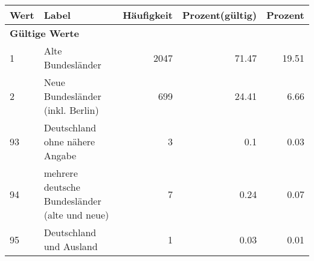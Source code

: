      \begin{longtable}{lXrrr}
     \toprule
     \textbf{Wert} & \textbf{Label} & \textbf{Häufigkeit} & \textbf{Prozent(gültig)} & \textbf{Prozent} \\
     \endhead
     \midrule
     \multicolumn{5}{l}{\textbf{Gültige Werte}}\\

     1 &
     \multicolumn{1}{X}{ Alte Bundesländer   } &


       \num{2047} &
       \num[round-mode=places,round-precision=2]{71.47} &
         \num[round-mode=places,round-precision=2]{19.51} \\

     2 &
     \multicolumn{1}{X}{ Neue Bundesländer (inkl. Berlin)   } &


       \num{699} &
       \num[round-mode=places,round-precision=2]{24.41} &
         \num[round-mode=places,round-precision=2]{6.66} \\

     93 &
     \multicolumn{1}{X}{ Deutschland ohne nähere Angabe   } &


       \num{3} &
       \num[round-mode=places,round-precision=2]{0.1} &
         \num[round-mode=places,round-precision=2]{0.03} \\

     94 &
     \multicolumn{1}{X}{ mehrere deutsche Bundesländer (alte und neue)   } &


       \num{7} &
       \num[round-mode=places,round-precision=2]{0.24} &
         \num[round-mode=places,round-precision=2]{0.07} \\

     95 &
     \multicolumn{1}{X}{ Deutschland und Ausland   } &


       \num{1} &
       \num[round-mode=places,round-precision=2]{0.03} &
         \num[round-mode=places,round-precision=2]{0.01} \\


\end{longtable}
